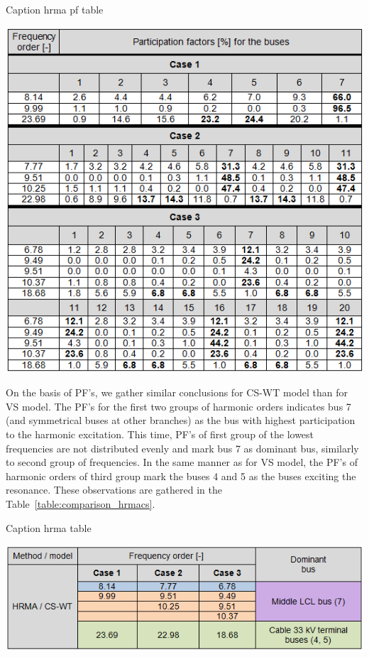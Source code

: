 \documentclass[12pt]{report} %
\begin{document}
\begin{table}[htb]
	\centering
	\caption{Caption hrma pf table}
	\includegraphics[width=1\textwidth]{img/Case123/PF_CS_table.png}
  	\label{table:comparison_pfcs}
\end{table}
\FloatBarrier

On the basis of PF's, we gather similar conclusions for CS-WT model than for VS model. The PF's for the first two groups of harmonic orders indicates bus 7 (and symmetrical buses at other branches) as the bus with highest participation to the harmonic excitation. This time, PF's of first group of the lowest frequencies are not distributed evenly and mark bus 7 as dominant bus, similarly to second group of frequencies. In the same manner as for VS model, the PF's of harmonic orders of third group mark the buses 4 and 5 as the buses exciting the resonance. These observations are gathered in the Table~\ref{table:comparison_hrmacs}.

\begin{table}[htb]
	\centering
	\caption{Caption hrma table}
	\includegraphics[width=1\textwidth]{img/Case123/HRMA_CS_table.png}
  	\label{table:comparison_hrmacs}
\end{table}
\FloatBarrier
\end{document}
